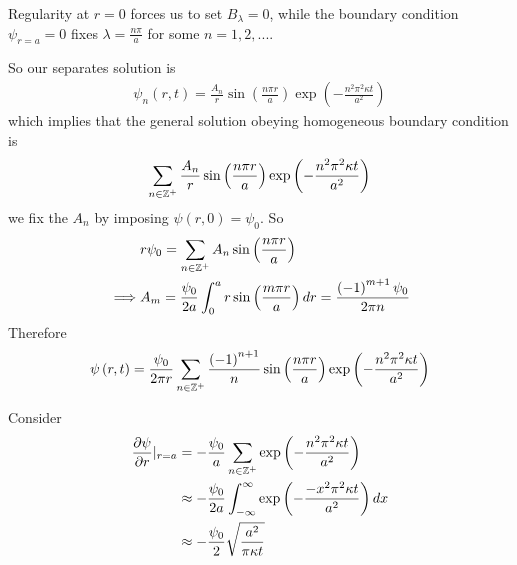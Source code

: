 \documentclass[a4paper]{article}
\begin{document}
Regularity at $r=0$ forces us to set $B_\lambda = 0$, while the boundary condition $\psi_{r=a} = 0$ fixes $\lambda = \frac{n\pi}{a}$ for some $n=1,2,...$.

So our separates solution is
\begin{equation*}
\begin{aligned}
\psi_n\left(r,t\right) = \frac{A_n}{r}\sin\left(\frac{n\pi r}{a}\right) \exp \left(-\frac{n^2 \pi^2 \kappa t}{a^2}\right)
\end{aligned}
\end{equation*}
which implies that the general solution obeying homogeneous boundary condition is
\begin{equation*}
\begin{aligned}
\sum_{n \in \mathbb{Z}^+} \frac{A_n}{r}\sin\left(\frac{n\pi r}{a}\right) \exp\left(-\frac{n^2 \pi^2 \kappa t}{a^2}\right)
\end{aligned}
\end{equation*}
we fix the $A_n$ by imposing $\psi\left(r,0\right) = \psi_0$. So
\begin{equation*}
\begin{aligned}
&r\psi_0 = \sum_{n \in \mathbb{Z}^+} A_n \sin\left(\frac{n\pi r}{a}\right)\\
\implies & A_m = \frac{\psi_0}{2a}\int_0^a r\sin\left(\frac{m\pi r}{a}\right) dr = \frac{\left(-1\right)^{m+1} \psi_0}{2\pi n}
\end{aligned}
\end{equation*}
Therefore
\begin{equation*}
\begin{aligned}
\psi\left(r,t\right) = \frac{\psi_0}{2\pi r}\sum_{n \in \mathbb{Z}^+} \frac{\left(-1\right)^{n+1}}{n} \sin\left(\frac{n\pi r}{a}\right) \exp\left(-\frac{n^2 \pi^2 \kappa t}{a^2}\right)
\end{aligned}
\end{equation*}

Consider
\begin{equation*}
\begin{aligned}
\frac{\partial \psi}{\partial r}|_{r=a} &= -\frac{\psi_0}{a} \sum_{n \in \mathbb{Z}^+} \exp\left(-\frac{n^2 \pi^2 \kappa t}{a^2}\right)\\
&\approx -\frac{\psi_0}{2a} \int_{-\infty}^\infty \exp\left(-\frac{-x^2\pi^2 \kappa t}{a^2}\right) dx\\
&\approx -\frac{\psi_0}{2} \sqrt{\frac{a^2}{\pi \kappa t}}
\end{aligned}
\end{equation*}
\end{document}

